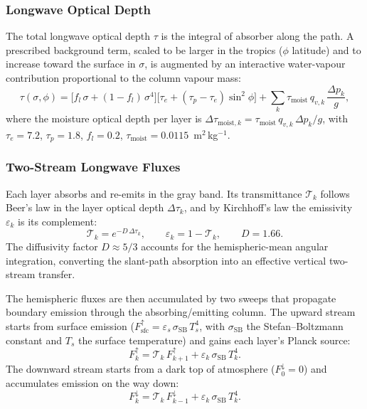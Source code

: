 \documentclass[11pt,twoside]{report}
\newcommand{\SB}{\sigma_{\mathrm{SB}}}
\begin{document}
\subsubsection{Longwave Optical Depth}

The total longwave optical depth $\tau$ is the integral of absorber along
the path. A prescribed background term, scaled to be larger in the tropics
($\phi$ latitude) and to increase toward the surface in $\sigma$, is
augmented by an interactive water-vapour contribution proportional to the
column vapour mass:
\begin{equation}
  \tau(\sigma,\phi) = \bigl[f_l\,\sigma+(1-f_l)\,\sigma^4\bigr]
  \bigl[\tau_e+(\tau_p-\tau_e)\sin^2\!\phi\bigr]
  + \sum_k \tau_{\mathrm{moist}}\,q_{v,k}\,\frac{\Delta p_k}{g},
\end{equation}
where the moisture optical depth per layer is
$\Delta\tau_{\mathrm{moist},k}=\tau_{\mathrm{moist}}\,q_{v,k}\,\Delta p_k/g$,
with $\tau_e=7.2$, $\tau_p=1.8$, $f_l=0.2$,
$\tau_{\mathrm{moist}}=0.0115$~m$^2$\,kg$^{-1}$.

\subsubsection{Two-Stream Longwave Fluxes}

Each layer absorbs and re-emits in the gray band. Its transmittance
$\mathcal{T}_k$ follows Beer's law in the layer optical depth
$\Delta\tau_k$, and by Kirchhoff's law the emissivity $\varepsilon_k$ is its
complement:
\begin{equation}
  \mathcal{T}_k = e^{-D\,\Delta\tau_k},
  \qquad \varepsilon_k = 1-\mathcal{T}_k,
  \qquad D=1.66.
\end{equation}
The diffusivity factor $D\approx 5/3$ accounts for the hemispheric-mean
angular integration, converting the slant-path absorption into an effective
vertical two-stream transfer.

The hemispheric fluxes are then accumulated by two sweeps that propagate
boundary emission through the absorbing/emitting column. The upward stream
starts from surface emission
($F^\uparrow_{\mathrm{sfc}}=\varepsilon_s\,\SB\,T_s^4$, with $\SB$ the
Stefan--Boltzmann constant and $T_s$ the surface temperature) and gains each
layer's Planck source:
\begin{equation}
  F^\uparrow_k = \mathcal{T}_k\,F^\uparrow_{k+1} + \varepsilon_k\,\SB\,T_k^4.
\end{equation}
The downward stream starts from a dark top of atmosphere ($F^\downarrow_0=0$)
and accumulates emission on the way down:
\begin{equation}
  F^\downarrow_k = \mathcal{T}_k\,F^\downarrow_{k-1} + \varepsilon_k\,\SB\,T_k^4.
\end{equation}
\end{document}
